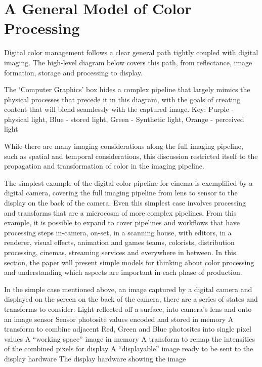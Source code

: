 \section{A General Model of Color Processing}%
\label{sec:a-general-model-of-color-processing}

Digital color management follows a clear general path tightly coupled with digital imaging. The high-level diagram below covers this path, from reflectance, image formation, storage and processing to display.

The ‘Computer Graphics’ box hides a complex pipeline that largely mimics the physical processes that precede it in this diagram, with the goals of creating content that will blend seamlessly with the captured image. Key: Purple - physical light, Blue - stored light, Green - Synthetic light, Orange - perceived light

While there are many imaging considerations along the full imaging pipeline, such as spatial and temporal considerations, this discussion restricted itself to the propagation and transformation of color in the imaging pipeline.

The simplest example of the digital color pipeline for cinema is exemplified by a digital camera, covering the full imaging pipeline from lens to sensor to the display on the back of the camera. Even this simplest case involves processing and transforms that are a microcosm of more complex pipelines. From this example, it is possible to expand to cover pipelines and workflows that have processing steps in-camera, on-set, in a scanning house, with editors, in a renderer, visual effects, animation and games teams, colorists, distribution processing, cinemas, streaming services and everywhere in between. In this section, the paper will present simple models for thinking about color processing and understanding which aspects are important in each phase of production.

In the simple case mentioned above, an image captured by a digital camera and displayed on the screen on the back of the camera, there are a series of states and transforms to consider:
Light reflected off a surface, into camera’s lens and onto an image sensor
Sensor photosite values encoded and stored in memory
A transform to combine adjacent Red, Green and Blue photosites into single pixel values
A “working space” image in memory
A transform to remap the intensities of the combined pixels for display
A “displayable” image ready to be sent to the display hardware
The display hardware showing the image


